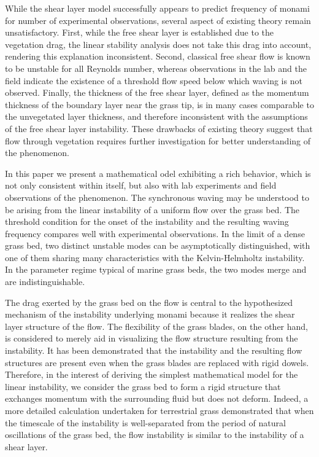 \documentclass[aps,prl,reprint,twocolumn,showpacs,superscriptaddress,10pt]{revtex4-1}  %
\newcommand{\shreyas}[1]{}
\begin{document}
While the shear layer model successfully appears to predict frequency of monami for number of experimental observations, several aspect of existing theory remain unsatisfactory. 
First, while the free shear layer is established due to the vegetation drag, the linear stability analysis\cite{Raupach96} does not take this drag into account, rendering this explanation inconsistent. 
Second, classical free shear flow is known to be unstable for all Reynolds number\cite{drazin}, whereas observations in the lab\cite{Ghisal02} and the field\cite{Grizzle96} indicate the existence of a threshold 
flow speed below which waving is not observed. 
Finally, the thickness of the free shear layer, defined as the momentum thickness of the boundary layer near the grass tip, is in many cases comparable to the unvegetated layer thickness,
and therefore inconsistent with the assumptions of the free shear layer instability. 
These drawbacks of existing theory suggest that flow through vegetation requires further investigation for better understanding of the phenomenon.

In this paper we present a mathematical \shreyas model exhibiting a rich behavior, which is not only consistent within itself, but also with lab experiments and field observations of the phenomenon.
The synchronous waving may be understood to be arising from the linear instability of a uniform flow over the grass bed. 
The threshold condition for the onset of the instability and the resulting waving frequency compares well with experimental observations.
In the limit of a dense grass bed, two distinct unstable modes can be asymptotically distinguished, with one of them sharing many characteristics with the Kelvin-Helmholtz instability. 
In the parameter regime typical of marine grass beds, the two modes merge and are indistinguishable.

The drag exerted by the grass bed on the flow is central to the hypothesized mechanism\cite{Ghisal02} of the instability underlying monami because it realizes the shear layer structure of the flow. 
The flexibility of the grass blades, on the other hand, is considered to merely aid in visualizing the flow structure resulting from the instability\cite{Nepf2012}. 
It has been demonstrated that the instability and the resulting flow structures are present even when the grass blades are replaced with rigid dowels\cite{Ghisal02}. 
Therefore, in the interest of deriving the simplest mathematical model for the linear instability, we consider the grass bed to form a rigid structure that exchanges momentum with the surrounding fluid but does not deform. 
Indeed, a more detailed calculation undertaken for terrestrial grass demonstrated\cite{Delangre06} that when the timescale of the instability is well-separated from the period of natural oscillations of the grass bed, 
the flow instability is similar to the instability of a shear layer. 
\end{document}
